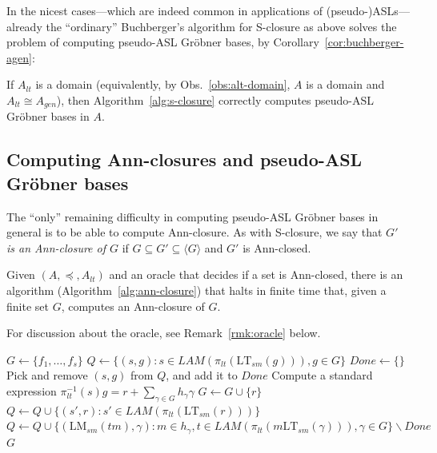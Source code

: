 \documentclass[11pt,reqno]{amsart}
\newcommand{\suchthat}{:}
\newcommand{\gb}{Gr\"{o}bner }
\newcommand{\lmsm}{\text{LM}_{sm}}
\newcommand{\ltsm}{\text{LT}_{sm}}
\theoremstyle{definition}
\numberwithin{equation}{section}
\begin{document}
In the nicest cases---which are indeed common in applications of (pseudo-)ASLs---already the ``ordinary'' Buchberger's algorithm for S-closure as above solves the problem of computing pseudo-ASL Gröbner bases, by Corollary~\ref{cor:buchberger-agen}: 

\begin{corollary} \label{cor:AgenGB}
If $A_{lt}$ is a domain (equivalently, by Obs.~\ref{obs:alt-domain}, $A$ is a domain and $A_{lt} \cong A_{gen}$), then Algorithm~\ref{alg:s-closure} correctly computes pseudo-ASL Gröbner bases in $A$.
\end{corollary}

\subsection{Computing Ann-closures and pseudo-ASL \gb bases}

The ``only'' remaining difficulty in computing pseudo-ASL Gröbner bases in general is to be able to compute Ann-closure. As with S-closure, we say that \emph{$G'$ is an Ann-closure of $G$} if $G \subseteq G' \subseteq \langle G \rangle$ and $G'$ is Ann-closed.

\begin{theorem} \label{thm:alg-ann-closure}
Given $(A, \preceq, A_{lt})$ and an oracle that decides if a set is Ann-closed, there is an algorithm (Algorithm~\ref{alg:ann-closure}) that halts in finite time that, given a finite set $G$, computes an Ann-closure of $G$.
\end{theorem}

For discussion about the oracle, see Remark~\ref{rmk:oracle} below.

\begin{algorithm}[h]
\caption{Computes Ann-closure of a finite set with respect to $(A, \preceq, A_{lt})$}
\label{alg:ann-closure}
\begin{algorithmic}[1]
\medskip
{}
    \State $G \gets \{f_1, \ldots, f_s\}$
    \State $Q \gets \{(s,g) \suchthat s \in LAM(\pi_{lt}(\ltsm(g))), g \in G\}$ \label{alg:ann-closure:LAM}
    \State $Done \gets \{\}$
    \Repeat
    	\State Pick and remove $(s,g)$ from $Q$, and add it to $Done$
	\State Compute a standard expression $\pi_{lt}^{-1}(s) g = r + \sum_{\gamma \in G} h_\gamma \gamma$ \label{alg:ann-closure:std}
	    \State $G \gets G \cup \{r\}$ \label{alg:ann-closure:add-remainder} \label{alg:ann-closure:add-to-G}
	    \State $Q \gets Q \cup \{(s',r) : s' \in LAM(\pi_{lt}(\ltsm(r)))\}$
	  \EndIf
	  \State $Q \gets Q \cup \{(\lmsm(tm),\gamma) \suchthat m \in h_{\gamma}, t \in LAM(\pi_{lt}(m\ltsm(\gamma))), \gamma \in G\} \backslash Done$ \label{alg:ann-closure:Qupdate}
     \label{alg:ann-closure-termination}
    \State \Return $G$
\EndProcedure
\end{algorithmic}
\end{algorithm}
\end{document}
